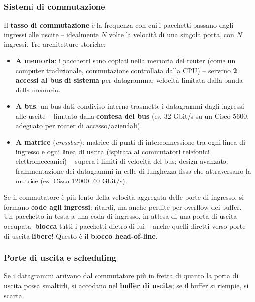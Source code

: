 \documentclass[12pt, a4paper]{article}
\begin{document}
\subsubsection{Sistemi di commutazione}

Il \textbf{tasso di commutazione} è la frequenza con cui i pacchetti passano dagli ingressi alle uscite -- idealmente $N$ volte la velocità di una singola porta, con $N$ ingressi. Tre architetture storiche:

\begin{itemize}
    \item \textbf{A memoria}: i pacchetti sono copiati nella memoria del router (come un computer tradizionale, commutazione controllata dalla CPU) -- servono \textbf{2 accessi al bus di sistema} per datagramma; velocità limitata dalla banda della memoria.
    \item \textbf{A bus}: un bus dati condiviso interno trasmette i datagrammi dagli ingressi alle uscite -- limitato dalla \textbf{contesa del bus} (es. 32 Gbit/s su un Cisco 5600, adeguato per router di accesso/aziendali).
    \item \textbf{A matrice} (\textit{crossbar}): matrice di punti di interconnessione tra ogni linea di ingresso e ogni linea di uscita (ispirata ai commutatori telefonici elettromeccanici) -- supera i limiti di velocità del bus; design avanzato: frammentazione dei datagrammi in celle di lunghezza fissa che attraversano la matrice (es. Cisco 12000: 60 Gbit/s).
\end{itemize}

\begin{tcolorbox}[colback=cyan!5, colframe=blue!40!black, title=\textbf{Head-of-Line (HOL) blocking}]
Se il commutatore è più lento della velocità aggregata delle porte di ingresso, si formano \textbf{code agli ingressi}: ritardi, ma anche perdite per overflow dei buffer. Un pacchetto in testa a una coda di ingresso, in attesa di una porta di uscita occupata, \textbf{blocca} tutti i pacchetti dietro di lui -- anche quelli diretti verso porte di uscita \textbf{libere}! Questo è il \textbf{blocco head-of-line}.
\end{tcolorbox}

\subsubsection{Porte di uscita e scheduling}

Se i datagrammi arrivano dal commutatore più in fretta di quanto la porta di uscita possa smaltirli, si accodano nel \textbf{buffer di uscita}; se il buffer si riempie, si scarta.
\end{document}
